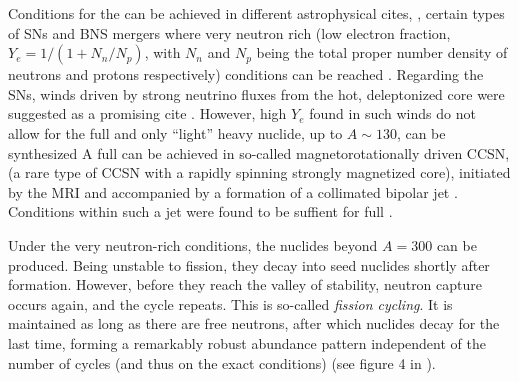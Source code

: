 Conditions for the \rproc{} can be achieved in different astrophysical cites, \eg, 
certain types of \acp{SN} and \ac{BNS} mergers where very neutron rich (low 
electron fraction, $Y_e = 1/(1 + N_n/N_p)$, with $N_n$ and $N_p$ being the 
total proper number density of neutrons and protons respectively) 
conditions can be reached
\citep{Mathews:1990,Thielemann:2011,Lippuner:2015gwa,Siegel:2019mlp}. 
Regarding the \acp{SN}, winds driven by strong neutrino fluxes from the hot, deleptonized
core \citep{Qian:1996xt} were suggested as a promising cite \citep{Woosley:2002,Wanajo:2006mq}.
However, high $Y_e$ found in such winds do not allow for the full \rproc{} and only ``light'' heavy 
nuclide, up to $A\sim130$, can be synthesized 
\citep{Qian:1996xt,Thompson:2001ys,Fischer:2010,Roberts:2010,MartinezPinedo:2012rb,Wanajo:2013} 
%
A full \rproc{} can be achieved in so-called magnetorotationally driven \ac{CCSN},
(a rare type of \ac{CCSN} with a rapidly spinning strongly magnetized core), 
initiated by the \ac{MRI} and accompanied by a %
formation of a 
collimated bipolar jet 
\citep{Wheeler:2000,Akiyama:2003,Burrows:2007yx,Mosta:2014jaa,Mosta:2015,Siegel:2019mlp}.
Conditions within such a jet were found to be suffient for full \rproc{} \nuc{} 
\citep{Winteler:2012,Nishimura:2015nca}.

%

Under the very neutron-rich conditions, 
the nuclides beyond $A=300$ can be produced. Being unstable to fission, they 
decay into seed nuclides shortly after formation.
However, before they reach the valley of stability, neutron capture occurs again, and the cycle repeats.
This is so-called \textit{fission cycling}.
It is maintained as long as there are free neutrons, after which nuclides decay 
for the last time, forming a remarkably robust abundance pattern independent of the 
number of cycles (and thus on the exact conditions) 
(see figure 4 in \citet{Korobkin:2012uy}).

